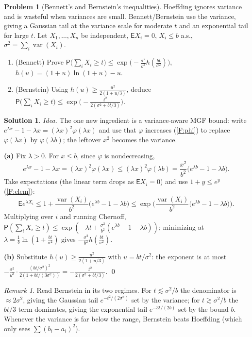\documentclass[14pt]{extarticle}
\theoremstyle{definition}
\newtheorem{exercise}{Problem}
\newtheorem*{solution}{Solution}
\theoremstyle{remark}
\newtheorem*{remark}{Remark}
\newcommand\expc{\mathsf{E}}
\newcommand\prb{\mathsf{P}}
\DeclareMathOperator\var{var}
\begin{document}
\begin{exercise}[Bennett's and Bernstein's inequalities]\label{prob:bern}
Hoeffding ignores variance and is wasteful when variances are small. Bennett/Bernstein use the variance, giving a Gaussian tail at the variance scale for moderate $t$ and an exponential tail for large $t$. Let $X_1,\ldots,X_n$ be independent, $\expc X_i=0$, $X_i\le b$ a.s., $\sigma^2=\sum_i\var(X_i)$.
\begin{enumerate}[label=(\alph*)]
\item (Bennett) Prove $\prb\bigl(\sum_iX_i\ge t\bigr)\le\exp\bigl(-\tfrac{\sigma^2}{b^2}h(\tfrac{bt}{\sigma^2})\bigr)$, $h(u)=(1+u)\ln(1+u)-u$.
\item (Bernstein) Using $h(u)\ge\tfrac{u^2}{2(1+u/3)}$, deduce $\prb\bigl(\sum_iX_i\ge t\bigr)\le\exp\bigl(-\tfrac{t^2}{2(\sigma^2+bt/3)}\bigr)$.
\end{enumerate}
\end{exercise}
\begin{solution}
\emph{Idea.} The one new ingredient is a variance-aware MGF bound: write $e^{\lambda x}-1-\lambda x=(\lambda x)^2\varphi(\lambda x)$ and use that $\varphi$ increases (\ref{F:phi}) to replace $\varphi(\lambda x)$ by $\varphi(\lambda b)$; the leftover $x^2$ becomes the variance.

\textbf{(a)} Fix $\lambda>0$. For $x\le b$, since $\varphi$ is nondecreasing,
\[
e^{\lambda x}-1-\lambda x=(\lambda x)^2\varphi(\lambda x)\le(\lambda x)^2\varphi(\lambda b)=\frac{x^2}{b^2}\big(e^{\lambda b}-1-\lambda b\big).
\]
Take expectations (the linear term drops as $\expc X_i=0$) and use $1+y\le e^y$ (\ref{F:elem}):
\[
\expc e^{\lambda X_i}\le1+\frac{\var(X_i)}{b^2}\big(e^{\lambda b}-1-\lambda b\big)\le\exp\Big(\frac{\var(X_i)}{b^2}\big(e^{\lambda b}-1-\lambda b\big)\Big).
\]
Multiplying over $i$ and running Chernoff, $\prb(\sum_iX_i\ge t)\le\exp(-\lambda t+\tfrac{\sigma^2}{b^2}(e^{\lambda b}-1-\lambda b))$; minimizing at $\lambda=\tfrac1b\ln(1+\tfrac{bt}{\sigma^2})$ gives $-\tfrac{\sigma^2}{b^2}h(\tfrac{bt}{\sigma^2})$.

\textbf{(b)} Substitute $h(u)\ge\tfrac{u^2}{2(1+u/3)}$ with $u=bt/\sigma^2$: the exponent is at most $-\tfrac{\sigma^2}{b^2}\cdot\tfrac{(bt/\sigma^2)^2}{2(1+bt/(3\sigma^2))}=-\tfrac{t^2}{2(\sigma^2+bt/3)}$. \qed
\end{solution}
\begin{remark}
Read Bernstein in its two regimes. For $t\lesssim\sigma^2/b$ the denominator is $\approx2\sigma^2$, giving the Gaussian tail $e^{-t^2/(2\sigma^2)}$ set by the variance; for $t\gtrsim\sigma^2/b$ the $bt/3$ term dominates, giving the exponential tail $e^{-3t/(2b)}$ set by the bound $b$. Whenever the variance is far below the range, Bernstein beats Hoeffding (which only sees $\sum(b_i-a_i)^2$).
\end{remark}
\end{document}
